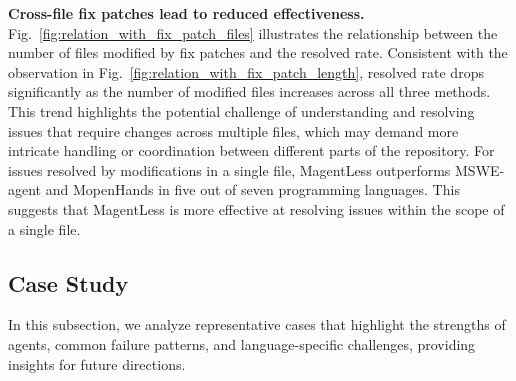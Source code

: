 \documentclass[11pt, a4paper, logo, copyright, nonumbering]{seed}
\newcommand{\magentless}{MagentLess\xspace}
\newcommand{\msweagent}{MSWE-agent\xspace}
\newcommand{\mopenhands}{MopenHands\xspace}
\begin{document}
\textbf{Cross-file fix patches lead to reduced effectiveness.}
Fig.~\ref{fig:relation_with_fix_patch_files} illustrates the relationship between the number of files modified by fix patches and the resolved rate. 
Consistent with the observation in Fig.~\ref{fig:relation_with_fix_patch_length}, resolved rate drops significantly as the number of modified files increases across all three methods.
This trend highlights the potential challenge of understanding and resolving issues that require changes across multiple files, which may demand more intricate handling or coordination between different parts of the repository.
For issues resolved by modifications in a single file, \magentless outperforms \msweagent and \mopenhands in five out of seven programming languages. This suggests that \magentless is more effective at resolving issues within the scope of a single file.





\subsection{Case Study}
\label{sec:case_study}
In this subsection, we analyze representative cases that highlight the strengths of agents, common failure patterns, and language-specific challenges, providing insights for future directions.
\end{document}
